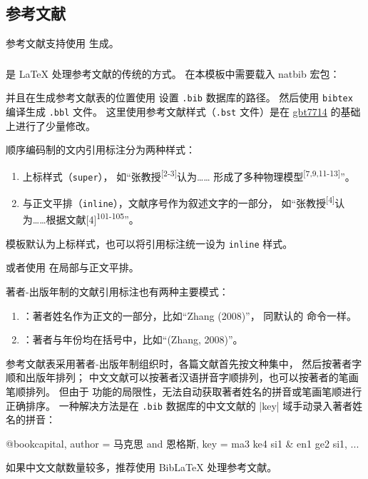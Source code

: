 \documentclass[a4paper]{ltxdoc}
\DeclareRobustCommand\file{\nolinkurl}
\DeclareRobustCommand\pkg{\textsf}
\DeclareRobustCommand\opt{\texttt}
\begin{document}
\subsection{参考文献}

参考文献支持使用 \BibTeX{} 生成。


\subsubsection{\BibTeX}

\BibTeX{} 是 \LaTeX{} 处理参考文献的传统的方式。
在本模板中需要载入 \pkg{natbib} 宏包：
\begin{latex}
  \usepackage[sort]{natbib}
  
\end{latex}
并且在生成参考文献表的位置使用  设置 \file{.bib} 数据库的路径。
然后使用 \file{bibtex} 编译生成 \file{.bbl} 文件。
这里使用参考文献样式（\file{.bst} 文件）是在
\href{https://ctan.org/pkg/gbt7714}{\pkg{gbt7714}}
的基础上进行了少量修改。

顺序编码制的文内引用标注分为两种样式：
\begin{enumerate}
  \item 上标样式（\opt{super}）， 如“张教授\textsuperscript{[2-3]}认为……
    形成了多种物理模型\textsuperscript{[7,9,11-13]}”。
  \item 与正文平排（\opt{inline}），文献序号作为叙述文字的一部分，
    如“张教授\textsuperscript{[4]}认为……根据文献[4]\textsuperscript{101-105}”。
\end{enumerate}

模板默认为上标样式，也可以将引用标注统一设为 \opt{inline} 样式。
\begin{latex}
\end{latex}
或者使用  在局部与正文平排。

著者-出版年制的文献引用标注也有两种主要模式：
\begin{enumerate}
  \item {}：著者姓名作为正文的一部分，比如“Zhang (2008)”，
    同默认的  命令一样。
  \item {}：著者与年份均在括号中，比如“(Zhang, 2008)”。
\end{enumerate}

参考文献表采用著者-出版年制组织时，各篇文献首先按文种集中， 然后按著者字顺和出版年排列；
中文文献可以按著者汉语拼音字顺排列，也可以按著者的笔画笔顺排列。
但由于 \BibTeX{} 功能的局限性，无法自动获取著者姓名的拼音或笔画笔顺进行正确排序。
一种解决方法是在 \file{.bib} 数据库的中文文献的 |key| 域手动录入著者姓名的拼音：
\begin{latex}
  @book{capital,
    author = {马克思 and 恩格斯},
    key    = {ma3 ke4 si1 & en1 ge2 si1},
    ...
  }
\end{latex}
如果中文文献数量较多，推荐使用 BibLaTeX 处理参考文献。
\end{document}
